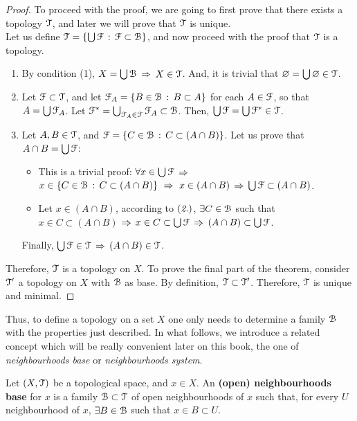 \begin{proof}
	To proceed with the proof, we are going to first prove that there exists a topology $\EuScript{T}$, and later
	we will prove that $\EuScript{T}$ is unique.\\
	Let us define $\EuScript{T} = \{\bigcup \EuScript{F}\,:\,\EuScript{F}\subset \EuScript{B}\}$, and now proceed with the proof
	that $\EuScript{T}$ is a topology.
	\begin{enumerate}
		\item By condition (1), $X=\bigcup \EuScript{B}$ $\Rightarrow$ $X\in \EuScript{T}$.
		And, it is trivial that $\varnothing = \bigcup \varnothing \in \EuScript{T}$.

		\item Let $\EuScript{F}\subset \EuScript{T}$, and let $\EuScript{F}_A=\{B\in \EuScript{B}\,:\, B\subset A\}$ for each
		$A\in\EuScript{F}$, so that $A=\bigcup\EuScript{F}_A$.
		Let $\EuScript{F}^*=\bigcup_{\EuScript{F}_A\in\EuScript{F}}\EuScript{F}_A\subset\EuScript{B}$.
		Then,  $\bigcup \EuScript{F} =\bigcup\EuScript{F}^*\in\EuScript{T}$.

		\item Let $A, B\in \EuScript{T}$, and $\EuScript{F} = \{C\in\EuScript{B}\,:\, C \subset(A\cap B)\}$.
		Let us prove that $A\cap B = \bigcup\EuScript{F}$:
		\begin{itemize}
			\item[\boxed{\supseteq}] This is a trivial proof: $\forall x\in\bigcup\EuScript{F}$ $\Rightarrow$
			$x\in\left\{C\in\EuScript{B}\,:\,C\subset(A\cap B)\right\}\ \Rightarrow\ x\in (A\cap B)$ $\Rightarrow$
			$\bigcup\EuScript{F} \subset (A\cap B)$.
			\item[\boxed{\subseteq}] Let $x\in (A\cap B)$, according to $(\emph{2.})$,
			$\exists C\in \EuScript{B}$ such that $x\in C\subset (A\cap B)$ $\Rightarrow$ $x\in C\subset
			\bigcup\EuScript{F}$ $\Rightarrow$ $(A\cap B)\subset \bigcup\EuScript{F}$.
		\end{itemize}
		Finally, $\bigcup \EuScript{F}\in \EuScript{T}$ $\Rightarrow$ $(A\cap B) \in \EuScript{T}$.
	\end{enumerate}
	Therefore, $\EuScript{T}$ is a topology on $X$.
	To prove the final part of the theorem, consider $\EuScript{T}'$ a topology on $X$ with
	$\EuScript{B}$ as base.
	By definition, $\EuScript{T}\subset \EuScript{T}'$.
	Therefore, $\EuScript{T}$ is unique and minimal.
\end{proof}

Thus, to define a topology on a set $X$ one only needs to determine a family $\EuScript{B}$ with
the properties just described.
In what follows, we introduce a related concept which
will be really convenient later on this book, the one of \emph{neighbourhoods base} or
\emph{neighbourhoods system}.

\begin{definition}
	\label{def:neighbourhoods-base}
	Let $(X, \EuScript{T})$ be a topological space, and $x\in X$.
	An \textbf{(open) neighbourhoods base} for $x$ is a family $\EuScript{B}\subset\EuScript{T}$ of open
	neighbourhoods of $x$ such that, for every $U$ neighbourhood of $x$, $\exists B\in\EuScript{B}$ such that
	$x\in B\subset U$.
\end{definition}

